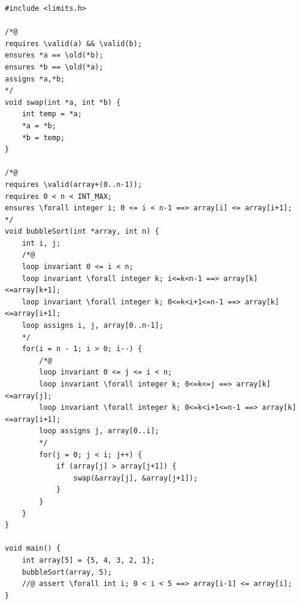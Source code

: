 \documentclass[varwidth=12.85cm]{standalone}
\begin{document}
\begin{verbatim}
#include <limits.h>

/*@
requires \valid(a) && \valid(b);
ensures *a == \old(*b);
ensures *b == \old(*a);
assigns *a,*b;
*/
void swap(int *a, int *b) {
    int temp = *a;
    *a = *b;
    *b = temp;
}

/*@ 
requires \valid(array+(0..n-1));
requires 0 < n < INT_MAX;
ensures \forall integer i; 0 <= i < n-1 ==> array[i] <= array[i+1];
*/
void bubbleSort(int *array, int n) {
    int i, j;
    /*@
    loop invariant 0 <= i < n;
    loop invariant \forall integer k; i<=k<n-1 ==> array[k]<=array[k+1];
    loop invariant \forall integer k; 0<=k<i+1<=n-1 ==> array[k]<=array[i+1];
    loop assigns i, j, array[0..n-1];
    */
    for(i = n - 1; i > 0; i--) {
        /*@
        loop invariant 0 <= j <= i < n;
        loop invariant \forall integer k; 0<=k<=j ==> array[k]<=array[j];
        loop invariant \forall integer k; 0<=k<i+1<=n-1 ==> array[k]<=array[i+1];
        loop assigns j, array[0..i];
        */
        for(j = 0; j < i; j++) {
            if (array[j] > array[j+1]) {
                swap(&array[j], &array[j+1]);
            }
        }
    }
}

void main() {
    int array[5] = {5, 4, 3, 2, 1};
    bubbleSort(array, 5);
    //@ assert \forall int i; 0 < i < 5 ==> array[i-1] <= array[i];
}
\end{verbatim}
\end{document}

